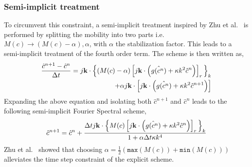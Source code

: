     \subsubsection{Semi-implicit treatment}
    To circumvent this constraint, a semi-implicit treatment inspired by Zhu et al.\ \cite{ZhuChenShenTikare1999} is performed by splitting the mobility into two parts i.e.\ $M(c) \rightarrow (M(c) - \alpha), \alpha$, with $\alpha$ the stabilization factor. This leads to a semi-implicit treatment of the fourth order term.
    The scheme is then written as,
    \begin{equation}
        \begin{aligned}
            \frac{\hat{c}^{n+1}-\hat{c}^n}{\Delta t} = j\mathbf{k} \cdot \Bigl\{ (M(c) - \alpha) \left[j\mathbf{k} \cdot \left(\hat{g(c^n)} + \kappa k^2 \hat{c}^n\right)\right]_r \Bigl\}_k\\
            + \alpha j\mathbf{k} \cdot \left[j\mathbf{k} \cdot \left(\hat{g(c^n)} + \kappa k^2 \hat{c}^{n+1}\right)\right]
        \end{aligned}
    \end{equation}
    Expanding the above equation and isolating both $\hat{c}^{n+1}$ and $\hat{c}^n$ leads to the following semi-implicit Fourier Spectral scheme,
    \begin{equation}
        \begin{aligned}
            \hat{c}^{n+1} = \hat{c}^n + \frac{\Delta t j\mathbf{k} \cdot \Bigl\{ M(c) \left[j\mathbf{k} \cdot \left(\hat{g(c^n)} + \kappa k^2 \hat{c}^n\right)\right]_r \Bigl\}_k}{1 + \alpha \Delta t \kappa k^4}
        \end{aligned}
    \end{equation}
    Zhu et al.\ \cite{ZhuChenShenTikare1999} showed that choosing $\alpha = \frac{1}{2} (\texttt{max}(M(c)) + \texttt{min}(M(c)))$ alleviates the time step constraint of the explicit scheme.

